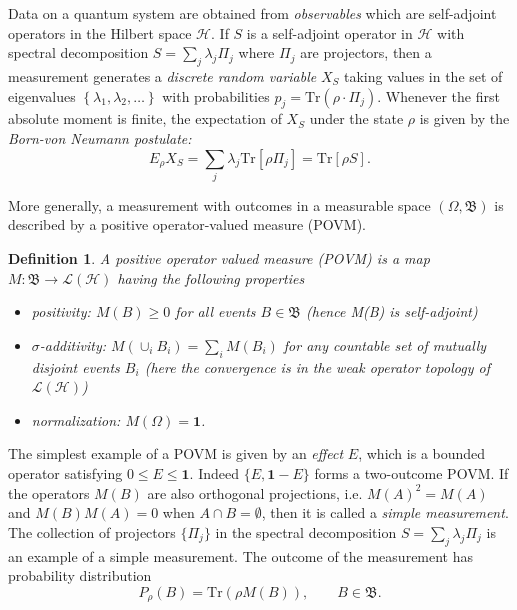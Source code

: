 \documentclass{article}
\newtheorem{definition}{Definition}
\theoremstyle{named}
\theoremstyle{named1}
\theoremstyle{plain}
\theoremstyle{remark}
\begin{document}
Data on a quantum system are obtained from
\textit{observables} which are self-adjoint operators in the Hilbert space $\mathcal{H}$. If  $S$ is a self-adjoint operator in {$\mathcal{H}$
with spectral decomposition }$S=\sum_{j}\lambda_{j}\Pi_{j}$ where $\Pi_{j}$
are projectors, then a measurement generates a \textit{discrete random variable} $X_{S}$ taking
values in the set of eigenvalues $\left\{  \lambda_{1},\lambda_{2}%
,\ldots\right\}  $ with probabilities $p_{j}=\mathrm{Tr}(\rho\cdot\Pi_{j})$. Whenever the first absolute moment is finite, the expectation of
\(X_S\) under the state \(\rho\) is given by the
\textit{Born-von Neumann postulate:}%
\begin{equation}
E_{\rho}X_{S}=\sum_{j}\lambda_{j}\mathrm{Tr}\left[  \rho\Pi_{j}\right]
=\mathrm{Tr}\left[  \rho S\right]  . \label{trace-rule}%
\end{equation}


More generally, a measurement with outcomes in a measurable space
$(\Omega,\mathfrak B)$ is described by a positive operator-valued
measure (POVM).
\begin{definition}\label{def.POVM}
A positive operator valued measure (POVM) is a map $M:\mathfrak{B}\to \mathcal{L}(%
\mathcal{H})$ having the following properties
\begin{itemize}
\item[1)] positivity: $M(B) \geq 0$ for all events $B\in\mathfrak{B}$ (hence M(B) is self-adjoint)
\item[2)] $\sigma$-additivity: $M(\cup_i B_i) = \sum_i {M}(B_i)$ for
any countable set of mutually disjoint events $B_i$ (here the convergence is in the weak operator topology of $\mathcal{L}(\mathcal{H})$)
\item[3)] normalization: $M(\Omega) = \mathbf{1}$.
\end{itemize}
\end{definition}

The simplest example of a POVM is given by an \emph{effect} $E$, which is a bounded operator satisfying $0\leq E\leq \mathbf{1}$. Indeed $\{E,\mathbf{1}-E\}$ forms a two-outcome POVM. If the operators $M(B)$ are also orthogonal projections, i.e. $M(A)^2=M(A)$ and $M(B)M(A)=0$ when $A\cap B=\emptyset$, then it is called a \textit{simple measurement}. The collection of projectors $\{\Pi_j\}$ in the spectral decomposition $S=\sum_j \lambda_j\Pi_j$ is an example of a simple measurement. The outcome of the measurement has probability
distribution
\begin{equation}
P_\rho(B) = \mathrm{Tr}(\rho M(B)), \qquad B\in \mathfrak{B}.
\label{prob_measurement}
\end{equation}
\end{document}
